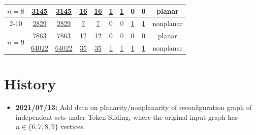 \documentclass[a4paper]{article}
\theoremstyle{definition}
\theoremstyle{remark}
\numberwithin{equation}{section}
\begin{document}
\begin{table}[!ht]
\begin{tabular}{|c|c|c|c|c|c|c|c|c|c|}
		\multirow{2}{*}{$n = 8$} & \href{ISReconf/TokenSliding/G.planar_conn.8.planarTS.txt}{3145}         & \href{ISReconf/TokenSliding/TSG.planar_conn.8.planar.txt}{3145}                   & \href{ISReconf/TokenSliding/G.trees.8.planarTS.txt}{16}    & \href{ISReconf/TokenSliding/TSG.planar_conn.8.planar.txt}{16}                & \href{ISReconf/TokenSliding/G.path.8.planarTS.txt}{1}     & \href{ISReconf/TokenSliding/TSG.path.8.planar.txt}{1}                 & 0     & 0                  & planar                                       \\ \cline{2-10} 
		& \href{ISReconf/TokenSliding/G.planar_conn.8.nonplanarTS.txt}{2829}         & \href{ISReconf/TokenSliding/TSG.planar_conn.8.kuratowski.txt}{2829}                   & \href{ISReconf/TokenSliding/G.trees.8.nonplanarTS.txt}{7}     & \href{ISReconf/TokenSliding/TSG.trees.8.kuratowski.txt}{7}                 & 0     & 0                 & \href{ISReconf/TokenSliding/G.cycle.8.nonplanarTS.txt}{1}     & \href{ISReconf/TokenSliding/TSG.cycle.8.kuratowski.txt}{1}                  & nonplanar                                    \\ \hline
		\multirow{2}{*}{$n = 9$} & \href{ISReconf/TokenSliding/G.planar_conn.9.planarTS.txt}{7863}         & \href{ISReconf/TokenSliding/TSG.planar_conn.9.planar.txt}{7863}                   & \href{ISReconf/TokenSliding/G.trees.9.planarTS.txt}{12}      & \href{ISReconf/TokenSliding/TSG.trees.9.planar.txt}{12}                  & 0     & 0                 & 0     & 0                  & planar                                       \\ \cline{2-10} 
		& \href{ISReconf/TokenSliding/G.planar_conn.9.nonplanarTS.txt}{64022}        & \href{ISReconf/TokenSliding/TSG.planar_conn.9.kuratowski.txt}{64022}                  & \href{ISReconf/TokenSliding/G.trees.9.nonplanarTS.txt}{35}      & \href{ISReconf/TokenSliding/TSG.trees.9.kuratowski.txt}{35}                  & \href{ISReconf/TokenSliding/G.path.9.nonplanarTS.txt}{1}     & \href{ISReconf/TokenSliding/TSG.path.9.kuratowski.txt}{1}                 & \href{ISReconf/TokenSliding/G.cycle.9.nonplanarTS.txt}{1}     & \href{ISReconf/TokenSliding/TSG.cycle.9.kuratowski.txt}{1}                  & nonplanar                                    \\ \hline
	\end{tabular}
\end{table}

\section*{History}

\begin{itemize}
	\item \textbf{2021/07/13:} Add data on planarity/nonplanarity of reconfiguration graph of independent sets under Token Sliding, where the original input graph has $n \in \{6, 7, 8, 9\}$ vertices.
\end{itemize}

%
%
%
\end{document}
